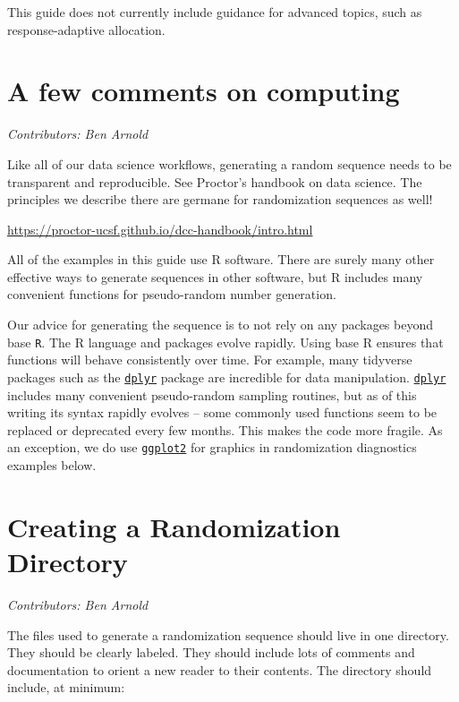 \documentclass[
]{book}
\begin{document}
This guide does not currently include guidance for advanced topics, such as response-adaptive allocation.

\hypertarget{computing}{%
\chapter{A few comments on computing}\label{computing}}

\emph{Contributors: Ben Arnold}

Like all of our data science workflows, generating a random sequence needs to be transparent and reproducible. See Proctor's handbook on data science. The principles we describe there are germane for randomization sequences as well!

\url{https://proctor-ucsf.github.io/dcc-handbook/intro.html}

All of the examples in this guide use R software. There are surely many other effective ways to generate sequences in other software, but R includes many convenient functions for pseudo-random number generation.

Our advice for generating the sequence is to not rely on any packages beyond base \texttt{R}. The R language and packages evolve rapidly. Using base R ensures that functions will behave consistently over time. For example, many tidyverse packages such as the \href{https://dplyr.tidyverse.org/}{\texttt{dplyr}} package are incredible for data manipulation. \href{https://dplyr.tidyverse.org/}{\texttt{dplyr}} includes many convenient pseudo-random sampling routines, but as of this writing its syntax rapidly evolves -- some commonly used functions seem to be replaced or deprecated every few months. This makes the code more fragile. As an exception, we do use \href{https://ggplot2.tidyverse.org/}{\texttt{ggplot2}} for graphics in randomization diagnostics examples below.

\hypertarget{directory}{%
\chapter{Creating a Randomization Directory}\label{directory}}

\emph{Contributors: Ben Arnold}

The files used to generate a randomization sequence should live in one directory. They should be clearly labeled. They should include lots of comments and documentation to orient a new reader to their contents. The directory should include, at minimum:
\end{document}
